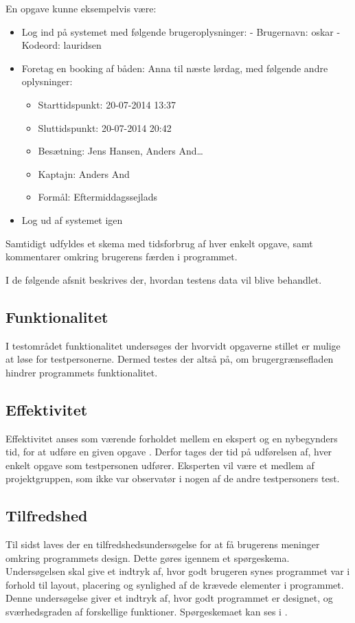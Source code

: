 En opgave kunne eksempelvis være:
\begin{itemize}
	\item Log ind på systemet med følgende brugeroplysninger:
	\newline - Brugernavn: oskar
	\newline - Kodeord: lauridsen
	\item Foretag en booking af båden: Anna til næste lørdag, med følgende andre oplysninger: 
	\begin{itemize}
		\item Starttidspunkt: 20-07-2014 13:37
		\item Sluttidspunkt: 20-07-2014 20:42
		\item Besætning: Jens Hansen, Anders And\ldots
		\item Kaptajn: Anders And
		\item Formål: Eftermiddagssejlads
	\end{itemize}
	\item Log ud af systemet igen
\end{itemize}

Samtidigt udfyldes et skema med tidsforbrug af hver enkelt opgave, samt kommentarer omkring brugerens færden i programmet.

I de følgende afsnit beskrives der, hvordan testens data vil blive behandlet.

\subsection{Funktionalitet}
I testområdet funktionalitet undersøges der hvorvidt opgaverne stillet er mulige at løse for testpersonerne.
Dermed testes der altså på, om brugergrænsefladen hindrer programmets funktionalitet.

\subsection{Effektivitet}
Effektivitet anses som værende forholdet mellem en ekspert og en nybegynders tid, for at udføre en given opgave \citep{UIEffeciency}.
Derfor tages der tid på udførelsen af, hver enkelt opgave som testpersonen udfører.
Eksperten vil være et medlem af projektgruppen, som ikke var observatør i nogen af de andre testpersoners test. 

\subsection{Tilfredshed}
Til sidst laves der en tilfredshedsundersøgelse for at få brugerens meninger omkring programmets design. 
Dette gøres igennem et spørgeskema. 
Undersøgelsen skal give et indtryk af, hvor godt brugeren synes programmet var i forhold til layout, placering og synlighed af de krævede elementer i programmet. 
Denne undersøgelse giver et indtryk af, hvor godt programmet er designet, og sværhedsgraden af forskellige funktioner. 
Spørgeskemaet kan ses i . \citep{UISatisfaction}


